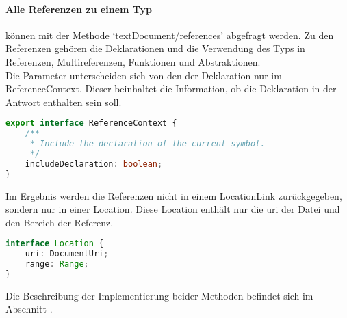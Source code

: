 \documentclass[./einleitung.tex]{subfiles}
\begin{document}
    \paragraph{Alle Referenzen zu einem Typ} können mit der Methode `textDocument/references' abgefragt werden.
    Zu den Referenzen gehören die Deklarationen und die Verwendung des Typs in Referenzen, Multireferenzen, Funktionen und Abstraktionen.\\
    Die Parameter unterscheiden sich von den der Deklaration nur im ReferenceContext.
    Dieser beinhaltet die Information, ob die Deklaration in der Antwort enthalten sein soll.
    \begin{lstlisting}[language=Typescript, title=Definition des ReferenceContext \cite{references}, label=lst:referenceContext]
export interface ReferenceContext {
	/**
	 * Include the declaration of the current symbol.
	 */
	includeDeclaration: boolean;
}
    \end{lstlisting}
    Im Ergebnis werden die Referenzen nicht in einem LocationLink zurückgegeben, sondern nur in einer Location.
    Diese Location enthält nur die \acrshort{uri} der Datei und den Bereich der Referenz.
    \begin{lstlisting}[language=Typescript, title=Definition der Location \cite{references}, label=lst:location]
interface Location {
	uri: DocumentUri;
	range: Range;
}
    \end{lstlisting}

    Die Beschreibung der Implementierung beider Methoden befindet sich im Abschnitt .
\end{document}
